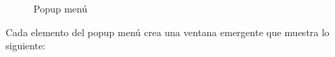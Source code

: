 \documentclass[12pt, a4paper]{book}
\begin{document}
	
	\begin{figure}[htbp]
		\centering
		\caption{Popup menú} \label{fig:menucartera}
	\end{figure}

Cada elemento del popup menú crea una ventana emergente que muestra lo siguiente:
\end{document}
